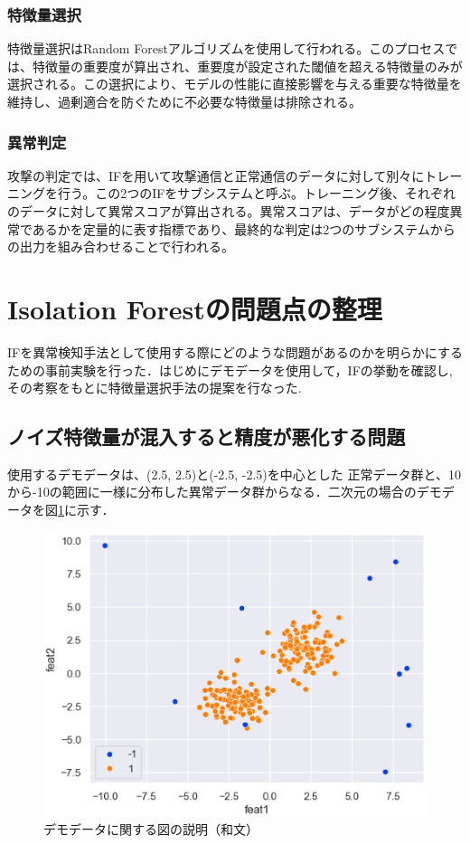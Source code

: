 \documentclass{css}
\begin{document}
\subsubsection{特徴量選択}

特徴量選択はRandom Forestアルゴリズムを使用して行われる。このプロセスでは、特徴量の重要度が算出され、重要度が設定された閾値を超える特徴量のみが選択される。この選択により、モデルの性能に直接影響を与える重要な特徴量を維持し、過剰適合を防ぐために不必要な特徴量は排除される。

\subsubsection{異常判定}

攻撃の判定では、IFを用いて攻撃通信と正常通信のデータに対して別々にトレーニングを行う。この2つのIFをサブシステムと呼ぶ。トレーニング後、それぞれのデータに対して異常スコアが算出される。異常スコアは、データがどの程度異常であるかを定量的に表す指標であり、最終的な判定は2つのサブシステムからの出力を組み合わせることで行われる。


\section{Isolation Forestの問題点の整理}
IFを異常検知手法として使用する際にどのような問題があるのかを明らかにするための事前実験を行った．はじめにデモデータを使用して，IFの挙動を確認し,その考察をもとに特徴量選択手法の提案を行なった.

\subsection{ノイズ特徴量が混入すると精度が悪化する問題}
使用するデモデータは、(2.5, 2.5)と(-2.5, -2.5)を中心とした
正常データ群と、10から-10の範囲に一様に分布した異常データ群からなる．二次元の場合のデモデータを図\ref{fig:demodata}に示す．

\begin{figure}[tb]
    \centering
    \includegraphics[width=\linewidth]{pictures/eps/demodata.eps}
    \caption{デモデータに関する図の説明（和文）}
    \label{fig:demodata}
\end{figure}
\end{document}
